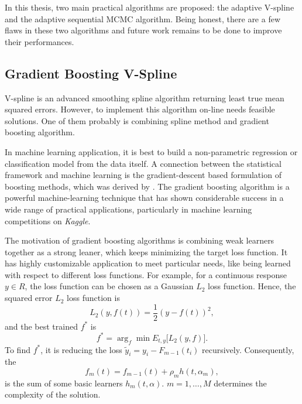 
In this thesis, two main practical algorithms are proposed: the adaptive V-spline and the adaptive sequential MCMC algorithm. Being honest, there are a few flaws in these two algorithms and future work remains to be done to improve their performances. 


\subsection*{Gradient Boosting V-Spline}

V-spline is an advanced smoothing spline algorithm returning least true mean squared errors. However, to implement this algorithm on-line needs feasible solutions. One of them probably is combining spline method and gradient boosting algorithm. 


In machine learning application, it is best to build a non-parametric regression or classification model from the data itself. A connection between the statistical framework and machine learning is the gradient-descent based formulation of boosting methods, which was derived by \cite{freund1995desicion, friedman2001greedy}. The gradient boosting algorithm is a powerful machine-learning technique that has shown considerable success in a wide range of practical applications, particularly in machine learning competitions on \textit{Kaggle}. 


The motivation of gradient boosting algorithms is combining weak learners together as a strong leaner, which keeps minimizing the target loss function. 
It has highly customizable application to meet particular needs, like being learned with respect to different loss functions. For example, for a continuous response $y\in \mathit{R}$, the loss function can be chosen as a Gaussian $L_2$ loss function. Hence, the squared error $L_2$ loss function is 
\begin{equation*}
L_2(y,f(t)) = \frac{1}{2}\left(y-f(t)\right)^2,
\end{equation*}
and the best trained $f^*$ is 
\begin{equation*}
f^* = \arg_{f}\min E_{t,y}\lbrack L_2\left(y,f\right)\rbrack.
\end{equation*}
To find $f^*$, it is reducing the loss $\tilde{y}_i=y_i-F_{m-1}(t_i)$ recursively. Consequently, the 
\begin{equation*}
f_m(t) = f_{m-1}(t)+ \rho_mh(t,\alpha_m),
\end{equation*}
is the sum of some basic learners $h_m(t,\alpha)$. $m=1,\ldots,M$ determines the complexity of the solution. 


